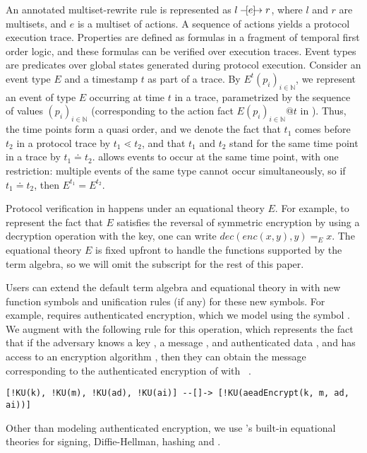 \documentclass[runningheads]{llncs}
\begin{document}
An annotated multiset-rewrite rule is represented as
$l \ifarrow[e] r$, where $l$ and $r$ are multisets, and $e$ is
a multiset of actions.
%
A sequence of actions yields a protocol execution trace.
%
Properties are defined as formulas in a fragment of temporal first order logic,
and these formulas can be verified over execution traces.
%
Event types are predicates over global states generated during protocol 
execution.
%
Consider an event type $E$ and a timestamp $t$ as part of a trace.
%
By $E^{t}(p_i)_{i\in\mathbb{N}}$, we represent an event of type $E$ occurring
at time $t$ in a trace, parametrized by the sequence of values
$(p_i)_{i\in\mathbb{N}}$
(corresponding to the action fact $E(p_i)_{i\in\mathbb{N}}@t$ in \mTamarin).
%
Thus, the time points form a quasi order, and we denote the fact that
$t_{1}$ comes before $t_{2}$ in a protocol trace by
$t_{1} \lessdot t_{2}$, and that $t_{1}$ and $t_{2}$ stand for the same
time point in a trace by $t_{1} \doteq t_{2}$.
%
\mTamarin{} allows events to occur at the same time point, with one
restriction: multiple events of the same type cannot occur simultaneously,
so if $t_{1} \doteq t_{2}$, then $E^{t_{1}} = E^{t_{2}}$.
%

Protocol verification in \mTamarin{} happens under an equational theory $E$.
%
For example, to represent the fact that $E$ satisfies the reversal of
symmetric encryption by using a decryption operation with the key,
one can write $\textit{dec}(\textit{enc}(x, y), y) =_{E} x$.
%
The equational theory $E$ is fixed upfront to handle the functions supported 
by
the term algebra, so we will omit the subscript for the rest of this paper.
%

Users can extend the default term algebra and equational theory in
\mTamarin{} with new function symbols and unification rules (if any) for these new 
symbols.
%
For example, \mEdhoc{} requires authenticated encryption, which we model 
using
the symbol .
%
We augment \mTamarin{} with the following rule for this operation,
which represents the fact that if the adversary knows a key ,
a message , and authenticated data ,
and has access to an encryption algorithm ,
then they can obtain the message corresponding to the authenticated 
encryption
of  with ~\cite{Norr21}.
%
{\footnotesize
\begin{verbatim}
[!KU(k), !KU(m), !KU(ad), !KU(ai)] --[]-> [!KU(aeadEncrypt(k, m, ad, ai))]
\end{verbatim}}
%
Other than modeling authenticated encryption, we use \mTamarin{}'s built-in
equational theories for signing, Diffie-Hellman, hashing and \mXor{}.
%
\end{document}
